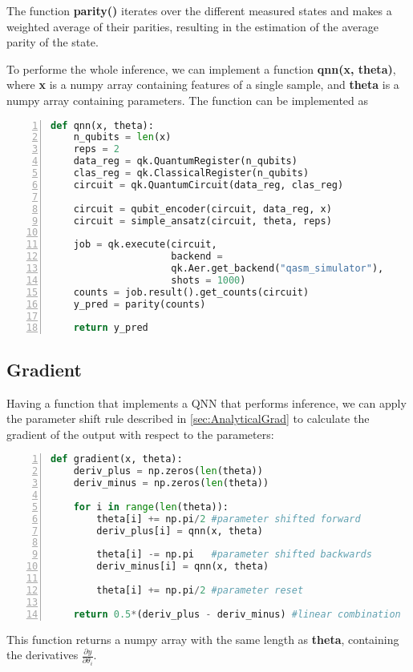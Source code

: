 The function \textbf{parity()} iterates over the different measured states and makes a weighted average of their parities, resulting in the estimation of the average parity of the state.

To performe the whole inference, we can implement a function \textbf{qnn(x, theta)}, where \textbf{x} is a numpy array containing features of a single sample, and \textbf{theta} is a numpy array containing parameters. The function can be implemented as 

\begin{lstlisting}[language=python, numbers=left]
def qnn(x, theta):
    n_qubits = len(x)
    reps = 2
    data_reg = qk.QuantumRegister(n_qubits)
    clas_reg = qk.ClassicalRegister(n_qubits)
    circuit = qk.QuantumCircuit(data_reg, clas_reg)
    
    circuit = qubit_encoder(circuit, data_reg, x)
    circuit = simple_ansatz(circuit, theta, reps)

    job = qk.execute(circuit, 
                     backend = 
                     qk.Aer.get_backend("qasm_simulator"),
                     shots = 1000)
    counts = job.result().get_counts(circuit)
    y_pred = parity(counts)
    
    return y_pred
\end{lstlisting}


\subsection{Gradient}\label{sec:GradientImplementation}
Having a function that implements a QNN that performs inference, we can apply the parameter shift rule described in \autoref{sec:AnalyticalGrad} to calculate the gradient of the output with respect to the parameters:

\begin{lstlisting}[language=python, numbers=left]
def gradient(x, theta):
    deriv_plus = np.zeros(len(theta))
    deriv_minus = np.zeros(len(theta))
    
    for i in range(len(theta)):
        theta[i] += np.pi/2 #parameter shifted forward
        deriv_plus[i] = qnn(x, theta) 
        
        theta[i] -= np.pi   #parameter shifted backwards
        deriv_minus[i] = qnn(x, theta)
        
        theta[i] += np.pi/2 #parameter reset
    
    return 0.5*(deriv_plus - deriv_minus) #linear combination
\end{lstlisting}
This function returns a numpy array with the same length as \textbf{theta}, containing the derivatives $\frac{\partial y}{\partial \theta_i}$.

